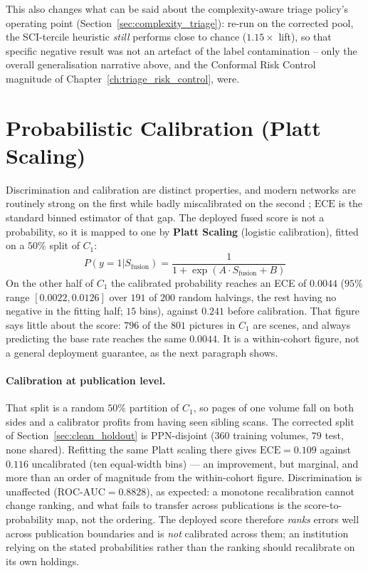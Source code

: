 \documentclass[12pt,a4paper]{report}
\begin{document}
This also changes what can be said about the complexity-aware triage policy's operating point (Section~\ref{sec:complexity_triage}): re-run on the corrected pool, the SCI-tercile heuristic \emph{still} performs close to chance ($1.15\times$ lift), so that specific negative result was not an artefact of the label contamination -- only the overall generalisation narrative above, and the Conformal Risk Control magnitude of Chapter~\ref{ch:triage_risk_control}, were.


\section{Probabilistic Calibration (Platt Scaling)}
Discrimination and calibration are distinct properties, and modern networks are routinely strong on the first while badly miscalibrated on the second \cite{guo2017calibration}; $\text{ECE}$ is the standard binned estimator of that gap. The deployed fused score is not a probability, so it is mapped to one by \textbf{Platt Scaling} \cite{platt1999probabilistic} (logistic calibration), fitted on a $50\%$ split of $C_1$:
\begin{equation}
    P(y=1 | S_{\text{fusion}}) = \frac{1}{1 + \exp(A \cdot S_{\text{fusion}} + B)}
\end{equation}
On the other half of $C_1$ the calibrated probability reaches an ECE of $0.0044$ ($95\%$ range $[0.0022, 0.0126]$ over $191$ of $200$ random halvings, the rest having no negative in the fitting half; $15$ bins), against $0.241$ before calibration. That figure says little about the score: $796$ of the $801$ pictures in $C_1$ are scenes, and always predicting the base rate reaches the same $0.0044$. It is a within-cohort figure, not a general deployment guarantee, as the next paragraph shows.

\paragraph{Calibration at publication level.} That split is a random $50\%$ partition of $C_1$, so pages of one volume fall on both sides and a calibrator profits from having seen sibling scans. The corrected split of Section~\ref{sec:clean_holdout} is PPN-disjoint ($360$ training volumes, $79$ test, none shared). Refitting the same Platt scaling there gives $\text{ECE} = 0.109$ against $0.116$ uncalibrated (ten equal-width bins) --- an improvement, but marginal, and more than an order of magnitude from the within-cohort figure. Discrimination is unaffected ($\text{ROC-AUC} = 0.8828$), as expected: a monotone recalibration cannot change ranking, and what fails to transfer across publications is the score-to-probability map, not the ordering. The deployed score therefore \emph{ranks} errors well across publication boundaries and is \emph{not} calibrated across them; an institution relying on the stated probabilities rather than the ranking should recalibrate on its own holdings.
\end{document}
